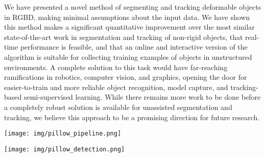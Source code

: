 \documentclass[journal]{IEEEtran}
\begin{document}
We have presented a novel method of segmenting and tracking deformable objects in RGBD, making minimal assumptions about the input data.  We have shown this method makes a significant quantitative improvement over the most similar state-of-the-art work in segmentation and tracking of non-rigid objects, that real-time performance is feasible, and that an online and interactive version of the algorithm is suitable for collecting training examples of objects in unstructured environments.  A complete solution to this task would have far-reaching ramifications in robotics, computer vision, and graphics, opening the door for easier-to-train and more reliable object recognition, model capture, and tracking-based semi-supervised learning.  While there remains more work to be done before a completely robust solution is available for unassisted segmentation and tracking, we believe this approach to be a promising direction for future research.




\begin{figure*}
\centering
        \texttt{[image: img/pillow\_pipeline.png]}
\caption{\small{Example data labeling pipeline demonstrating one possible application of the presented algorithm.  Segmented objects are obtained while the raw data is being recorded.  Segmentation hints from the user generate node potentials in the CRF so the user can direct the segmentation at any time; without input, the segmenter makes use of only the other cues discussed in Section~\ref{sec:energy} to produce segmentation masks. The output is a set of segmented object examples suitable for training standard object detectors. }}
\label{fig:data_labeling}
\end{figure*}

\begin{figure*}
\centering
        \texttt{[image: img/pillow\_detection.png]}
\caption{\small{Object detection example trained using the method in Figure~\ref{fig:data_labeling}. Color and depth templates are extracted from pillow examples collected using the presented algorithm.  An appropriate object detection method (LINE-MOD in our example) searches for the templates in previously-unseen test frames and identifies ``detections'' as matches with responses exceeding a threshold.}}
\label{fig:object_rec}
\end{figure*}
\end{document}
